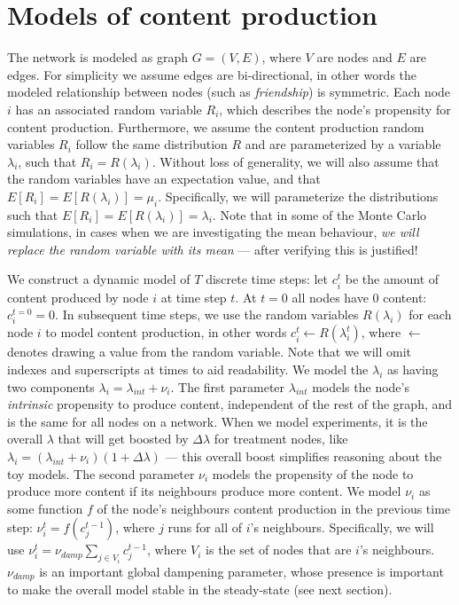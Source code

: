 \documentclass[final,5p,times,twocolumn,authoryear]{elsarticle}
\begin{document}
\section{Models of content production}

The network is modeled as graph $G = (V, E)$, where $V$ are nodes and $E$ are edges. For simplicity we assume edges are bi-directional, in other words the modeled relationship between nodes (such as \textit{friendship}) is symmetric. Each node $i$ has an associated random variable $R_i$, which describes the node's propensity for content production. Furthermore, we assume the content production random variables $R_i$ follow the same distribution $R$ and are parameterized by a variable $\lambda_i$, such that $R_i = R(\lambda_i)$. Without loss of generality, we will also assume that the random variables have an expectation value, and that $E[R_i] = E[R(\lambda_i)] = \mu_i$. Specifically, we will parameterize the distributions such that $E[R_i] = E[R(\lambda_i)] = \lambda_i$. Note that in some of the Monte Carlo simulations, in cases when we are investigating the mean behaviour, \textit{we will replace the random variable with its mean} --- after verifying this is justified!

We construct a dynamic model of $T$ discrete time steps: let $c_i^t$ be the amount of content produced by node $i$ at time step $t$. At $t=0$ all nodes have 0 content: $c_i^{t=0}=0$. In subsequent time steps, we use the random variables $R(\lambda_i)$ for each node $i$ to model content production, in other words $c_i^t \leftarrow R(\lambda_i^t)$, where $\leftarrow$ denotes drawing a value from the random variable. Note that we will omit indexes and superscripts at times to aid readability. We model the $\lambda_i$ as having two components $\lambda_i = \lambda_{int} + \nu_i$. The first parameter $\lambda_{int}$ models the node's \textit{intrinsic} propensity to produce content, independent of the rest of the graph, and is the same for all nodes on a network. When we model experiments, it is the overall $\lambda$ that will get boosted by $\Delta \lambda$ for treatment nodes, like $\lambda_i = (\lambda_{int} + \nu_i)(1 + \Delta \lambda)$ --- this overall boost simplifies reasoning about the toy models. The second parameter $\nu_i$ models the propensity of the node to produce more content if its neighbours produce more content. We model $\nu_i$ as some function $f$ of the node's neighbours content production in the previous time step: $\nu_i^t = f(c_j^{t-1})$, where $j$ runs for all of $i$'s neighbours. Specifically, we will use $\nu_i^t = \nu_{damp} \sum_{j \in V_i}{c_j^{t-1}}$, where $V_i$ is the set of nodes that are $i$'s neighbours. $\nu_{damp}$ is an important global dampening parameter, whose presence is important to make the overall model stable in the steady-state (see next section).
\end{document}
